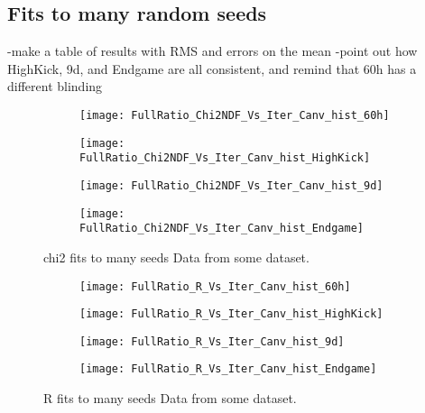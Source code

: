 \subsection{Fits to many random seeds}

-make a table of results with RMS and errors on the mean
-point out how HighKick, 9d, and Endgame are all consistent, and remind that 60h has a different blinding



\begin{figure}[]
\centering
    \begin{subfigure}[]{0.45\textwidth}
        \centering
        \texttt{[image: FullRatio\_Chi2NDF\_Vs\_Iter\_Canv\_hist\_60h]}
        \caption{}
    \end{subfigure}%
    \begin{subfigure}[]{0.45\textwidth}
        \centering
        \texttt{[image: FullRatio\_Chi2NDF\_Vs\_Iter\_Canv\_hist\_HighKick]}
        \caption{}
    \end{subfigure}

    \begin{subfigure}[]{0.45\textwidth}
        \centering
        \texttt{[image: FullRatio\_Chi2NDF\_Vs\_Iter\_Canv\_hist\_9d]}
        \caption{}
    \end{subfigure}%
    \begin{subfigure}[]{0.45\textwidth}
        \centering
        \texttt{[image: FullRatio\_Chi2NDF\_Vs\_Iter\_Canv\_hist\_Endgame]}
        \caption{}
    \end{subfigure}
\caption[]{chi2 fits to many seeds Data from some dataset.}
\label{fig:}
\end{figure}


\begin{figure}[]
\centering
    \begin{subfigure}[]{0.45\textwidth}
        \centering
        \texttt{[image: FullRatio\_R\_Vs\_Iter\_Canv\_hist\_60h]}
        \caption{}
    \end{subfigure}%
    \begin{subfigure}[]{0.45\textwidth}
        \centering
        \texttt{[image: FullRatio\_R\_Vs\_Iter\_Canv\_hist\_HighKick]}
        \caption{}
    \end{subfigure}

    \begin{subfigure}[]{0.45\textwidth}
        \centering
        \texttt{[image: FullRatio\_R\_Vs\_Iter\_Canv\_hist\_9d]}
        \caption{}
    \end{subfigure}%
    \begin{subfigure}[]{0.45\textwidth}
        \centering
        \texttt{[image: FullRatio\_R\_Vs\_Iter\_Canv\_hist\_Endgame]}
        \caption{}
    \end{subfigure}
\caption[]{R fits to many seeds Data from some dataset.}
\label{fig:}
\end{figure}


